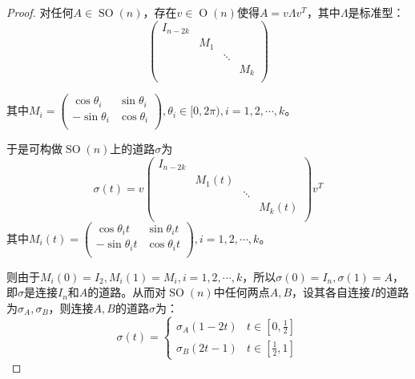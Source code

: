 \documentclass[UTF-8,11pt,fancyhdr,hyperref,titlepage]{ctexart}
\theoremstyle{question}
\theoremstyle{theorem}
\theoremstyle{definition}
\theoremstyle{remark}
\DeclareMathOperator{\SO}{SO}
\DeclareMathOperator{\GO}{O}
\begin{document}
\begin{proof}
  对任何$A\in\SO(n)$，存在$v\in\GO(n)$使得$A=v\Lambda v^T$，其中$\Lambda$是标准型：
  \begin{equation*}
    \begin{pmatrix}
       I_{n-2k} &  &  &  \\
         & M_1 &  &  \\
         &  & \ddots &  \\
         &  &  & M_k \\
    \end{pmatrix}
  \end{equation*}
  
  其中$M_i=\begin{pmatrix}
           \cos\theta_i & \sin\theta_i \\
           -\sin\theta_i & \cos\theta_i \\
         \end{pmatrix}
         , \theta_i\in[0,2\pi), i=1,2,\cdots,k  $。

  于是可构做$\SO(n)$上的道路$\sigma$为
  \begin{equation*}
    \sigma(t)=v    \begin{pmatrix}
       I_{n-2k} &  &  &  \\
         & M_1(t) &  &  \\
         &  & \ddots &  \\
         &  &  & M_k(t) \\
    \end{pmatrix}v^T
  \end{equation*}
  其中$M_i(t)=\begin{pmatrix}
           \cos\theta_it & \sin\theta_it \\
           -\sin\theta_it & \cos\theta_it \\
         \end{pmatrix}
         , i=1,2,\cdots,k$。

  则由于$M_i(0)=I_2,M_i(1)=M_i, i=1,2,\cdots,k$，所以$\sigma(0)=I_n, \sigma(1)=A$，即$\sigma$是连接$I_n$和$A$的道路。从而对$\SO(n)$中任何两点$A,B$，设其各自连接$I$的道路为$\sigma_A, \sigma_B$，则连接$A,B$的道路$\sigma$为：
  \begin{equation*}
    \sigma(t)=
    \begin{cases}
      \sigma_A(1-2t)& t\in[0,\frac{1}{2}]\\
      \sigma_B(2t-1)& t\in[\frac{1}{2},1]
    \end{cases}
  \end{equation*}
\end{proof}
\end{document}
